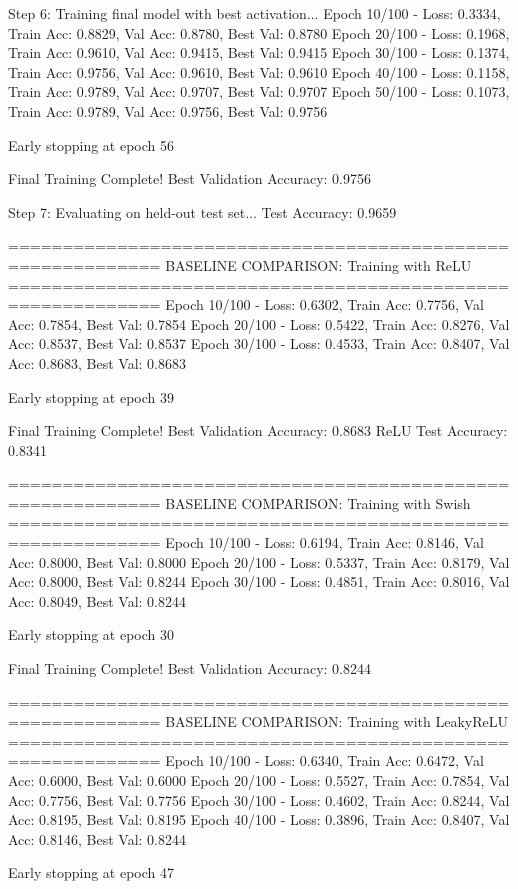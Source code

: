 Step 6: Training final model with best activation...
Epoch  10/100 - Loss: 0.3334, Train Acc: 0.8829, Val Acc: 0.8780, Best Val: 0.8780
Epoch  20/100 - Loss: 0.1968, Train Acc: 0.9610, Val Acc: 0.9415, Best Val: 0.9415
Epoch  30/100 - Loss: 0.1374, Train Acc: 0.9756, Val Acc: 0.9610, Best Val: 0.9610
Epoch  40/100 - Loss: 0.1158, Train Acc: 0.9789, Val Acc: 0.9707, Best Val: 0.9707
Epoch  50/100 - Loss: 0.1073, Train Acc: 0.9789, Val Acc: 0.9756, Best Val: 0.9756

Early stopping at epoch 56

Final Training Complete!
Best Validation Accuracy: 0.9756

Step 7: Evaluating on held-out test set...
Test Accuracy: 0.9659

============================================================
BASELINE COMPARISON: Training with ReLU
============================================================
Epoch  10/100 - Loss: 0.6302, Train Acc: 0.7756, Val Acc: 0.7854, Best Val: 0.7854
Epoch  20/100 - Loss: 0.5422, Train Acc: 0.8276, Val Acc: 0.8537, Best Val: 0.8537
Epoch  30/100 - Loss: 0.4533, Train Acc: 0.8407, Val Acc: 0.8683, Best Val: 0.8683

Early stopping at epoch 39

Final Training Complete!
Best Validation Accuracy: 0.8683
ReLU Test Accuracy: 0.8341

============================================================
BASELINE COMPARISON: Training with Swish
============================================================
Epoch  10/100 - Loss: 0.6194, Train Acc: 0.8146, Val Acc: 0.8000, Best Val: 0.8000
Epoch  20/100 - Loss: 0.5337, Train Acc: 0.8179, Val Acc: 0.8000, Best Val: 0.8244
Epoch  30/100 - Loss: 0.4851, Train Acc: 0.8016, Val Acc: 0.8049, Best Val: 0.8244

Early stopping at epoch 30

Final Training Complete!
Best Validation Accuracy: 0.8244

============================================================
BASELINE COMPARISON: Training with LeakyReLU
============================================================
Epoch  10/100 - Loss: 0.6340, Train Acc: 0.6472, Val Acc: 0.6000, Best Val: 0.6000
Epoch  20/100 - Loss: 0.5527, Train Acc: 0.7854, Val Acc: 0.7756, Best Val: 0.7756
Epoch  30/100 - Loss: 0.4602, Train Acc: 0.8244, Val Acc: 0.8195, Best Val: 0.8195
Epoch  40/100 - Loss: 0.3896, Train Acc: 0.8407, Val Acc: 0.8146, Best Val: 0.8244

Early stopping at epoch 47

